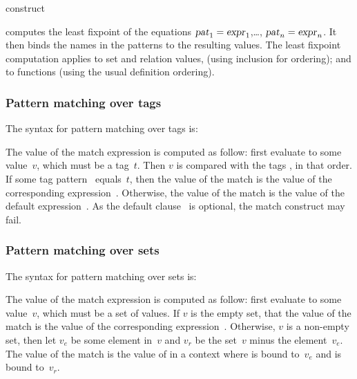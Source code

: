  construct
\begin{center}
  
\end{center}
computes the least fixpoint of the equations
$\hbox{\sl pat\/}_1 = \hbox{\sl expr\/}_1$,\ldots, $\hbox{\sl pat\/}_n = \hbox{\sl expr\/}_n$.
It then binds the names in the patterns
 to the
resulting values.
The least fixpoint computation applies to set and relation values,
(using inclusion for ordering); and to
functions (using the usual definition ordering).


\subsubsection*{Pattern matching over tags}
The syntax for pattern matching over tags is:
\begin{center}
\end{center}
The value of the match expression is computed as follow: first evaluate
 to some value~$v$, which must be a tag~$t$.
Then $v$ is compared with the tags ,
in that order.
If some tag pattern~ equals~$t$, then the value of the
match is the value of the corresponding expression~.
Otherwise, the value of the match is the value of the default
expression~.
As the default clause~ is optional,
the match construct may fail.

\subsubsection*{Pattern matching over sets}
The syntax for pattern matching over sets is:
\begin{center}
\end{center}
The value of the match expression is computed as follow: first evaluate
 to some value~$v$, which must be a set of values.
If $v$ is the empty set, that the value of the match is the
value of the corresponding expression~.
Otherwise, $v$ is a non-empty set, then let $v_e$ be some element in~$v$
and $v_r$ be the set~$v$ minus the element~$v_e$.
The value of the match is the value of  in a context
where  is bound to~$v_e$ and  is bound
to~$v_r$.

